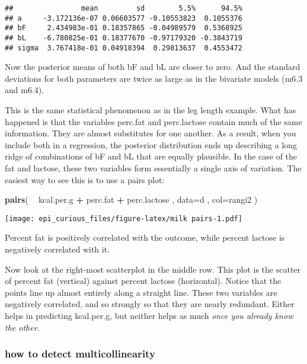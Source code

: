 \documentclass[
]{article}
\newenvironment{Shaded}{\begin{snugshade}}{\end{snugshade}}
\newcommand{\DataTypeTok}[1]{\textcolor[rgb]{0.13,0.29,0.53}{#1}}
\newcommand{\KeywordTok}[1]{\textcolor[rgb]{0.13,0.29,0.53}{\textbf{#1}}}
\newcommand{\NormalTok}[1]{#1}
\newcommand{\OperatorTok}[1]{\textcolor[rgb]{0.81,0.36,0.00}{\textbf{#1}}}
\newcommand{\StringTok}[1]{\textcolor[rgb]{0.31,0.60,0.02}{#1}}
\begin{document}
\begin{verbatim}
##                mean         sd        5.5%      94.5%
## a     -3.172136e-07 0.06603577 -0.10553823  0.1055376
## bF     2.434983e-01 0.18357865 -0.04989579  0.5368925
## bL    -6.780825e-01 0.18377670 -0.97179320 -0.3843719
## sigma  3.767418e-01 0.04918394  0.29813637  0.4553472
\end{verbatim}

Now the posterior means of both bF and bL are closer to zero. And the
standard deviations for both parameters are twice as large as in the
bivariate models (m6.3 and m6.4).

This is the same statistical phenomenon as in the leg length example.
What has happened is that the variables perc.fat and perc.lactose
contain much of the same information. They are almost substitutes for
one another. As a result, when you include both in a regression, the
posterior distribution ends up describing a long ridge of combinations
of bF and bL that are equally plausible. In the case of the fat and
lactose, these two variables form essentially a single axis of
variation. The easiest way to see this is to use a pairs plot:

\begin{Shaded}
\begin{Highlighting}[]
 \KeywordTok{pairs}\NormalTok{( }\OperatorTok{~}\StringTok{ }\NormalTok{kcal.per.g }\OperatorTok{+}\StringTok{ }\NormalTok{perc.fat }\OperatorTok{+}\StringTok{ }\NormalTok{perc.lactose , }\DataTypeTok{data=}\NormalTok{d , }\DataTypeTok{col=}\NormalTok{rangi2 )}
\end{Highlighting}
\end{Shaded}

\texttt{[image: epi\_curious\_files/figure-latex/milk pairs-1.pdf]}

Percent fat is positively correlated with the outcome, while percent
lactose is negatively correlated with it.

Now look at the right-most scatterplot in the middle row. This plot is
the scatter of percent fat (vertical) against percent lactose
(horizontal). Notice that the points line up almost entirely along a
straight line. These two variables are negatively correlated, and so
strongly so that they are nearly redundant. Either helps in predicting
kcal.per.g, but neither helps as much \emph{once you already know the
other}.

\hypertarget{how-to-detect-multicollinearity}{%
\subsubsection{how to detect
multicollinearity}\label{how-to-detect-multicollinearity}}
\end{document}
